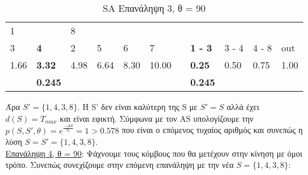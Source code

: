 \documentclass[12pt, a4paper]{article}
\begin{document}
\begin{table}[H]
\centering
\begin{tabular}{lllllllllll}
\multicolumn{1}{|l}{1}     & \multicolumn{1}{l|}{\textbf{}}     & 8                         &                           &                          &      &                                &                                     &                            &                            &      \\
\multicolumn{1}{|l|}{3}    & \multicolumn{1}{l|}{\textbf{4}}    & \multicolumn{1}{l|}{2}    & \multicolumn{1}{l|}{5}    & \multicolumn{1}{l|}{6}   & 7    & \multicolumn{1}{l|}{\textbf{}} & \multicolumn{1}{l|}{\textbf{1 - 3}} & \multicolumn{1}{l|}{3 - 4} & \multicolumn{1}{l|}{4 - 8} & out  \\ \cline{1-6} \cline{8-11} 
\multicolumn{1}{|l|}{1.66} & \multicolumn{1}{l|}{\textbf{3.32}} & \multicolumn{1}{l|}{4.98} & \multicolumn{1}{l|}{6.64} & \multicolumn{1}{l|}{8.30} & 10.00 & \multicolumn{1}{l|}{\textbf{}} & \multicolumn{1}{l|}{\textbf{0.25}}  & \multicolumn{1}{l|}{0.50}  & \multicolumn{1}{l|}{0.75}  & 1.00 \\
                           & \textbf{0.245}                     &                           &                           &                          &      & \textbf{}                      & \textbf{0.245}                      &                            &                            &     
\end{tabular}
\caption{SA Επανάληψη 3, θ = 90}
\label{my-label}
\end{table}

Άρα \(S'=\{1,4,3,8\}\). Η S' δεν είναι καλύτερη της S με \(S'=S\) αλλά έχει \(d(S) = T_{max}\) και είναι εφικτή. Σύμφωνα με τον AS υπολογίζουμε την \(p(S,S',θ) =  e^{\frac{-\Delta S}{\theta_t}} = 1 > 0.578\) που είναι ο επόμενος τυχαίος αριθμός και συνεπώς η λύση \(S = S' = \{1,4,3,8\}\). \\


\underline{Επανάληψη 4, θ = 90}: Ψάχνουμε τους κόμβους που θα μετέχουν στην κίνηση με όμοι τρόπο. Συνεπώς συνεχίζουμε στην επόμενη επανάληψη με την νέα \(S = \{1,4,3,8\}\):
\end{document}

